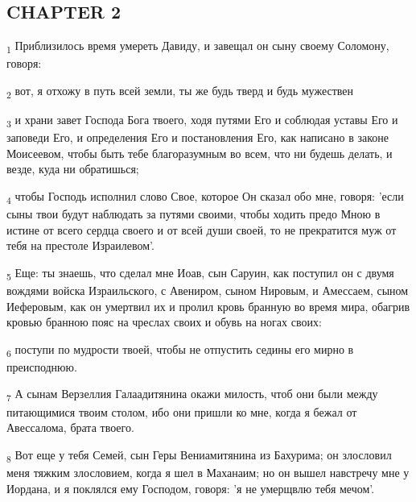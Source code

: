 \subsection{CHAPTER 2}
\begin{tcolorbox}
\textsubscript{1} Приблизилось время умереть Давиду, и завещал он сыну своему Соломону, говоря:
\end{tcolorbox}
\begin{tcolorbox}
\textsubscript{2} вот, я отхожу в путь всей земли, ты же будь тверд и будь мужествен
\end{tcolorbox}
\begin{tcolorbox}
\textsubscript{3} и храни завет Господа Бога твоего, ходя путями Его и соблюдая уставы Его и заповеди Его, и определения Его и постановления Его, как написано в законе Моисеевом, чтобы быть тебе благоразумным во всем, что ни будешь делать, и везде, куда ни обратишься;
\end{tcolorbox}
\begin{tcolorbox}
\textsubscript{4} чтобы Господь исполнил слово Свое, которое Он сказал обо мне, говоря: 'если сыны твои будут наблюдать за путями своими, чтобы ходить предо Мною в истине от всего сердца своего и от всей души своей, то не прекратится муж от тебя на престоле Израилевом'.
\end{tcolorbox}
\begin{tcolorbox}
\textsubscript{5} Еще: ты знаешь, что сделал мне Иоав, сын Саруин, как поступил он с двумя вождями войска Израильского, с Авениром, сыном Нировым, и Амессаем, сыном Иеферовым, как он умертвил их и пролил кровь бранную во время мира, обагрив кровью бранною пояс на чреслах своих и обувь на ногах своих:
\end{tcolorbox}
\begin{tcolorbox}
\textsubscript{6} поступи по мудрости твоей, чтобы не отпустить седины его мирно в преисподнюю.
\end{tcolorbox}
\begin{tcolorbox}
\textsubscript{7} А сынам Верзеллия Галаадитянина окажи милость, чтоб они были между питающимися твоим столом, ибо они пришли ко мне, когда я бежал от Авессалома, брата твоего.
\end{tcolorbox}
\begin{tcolorbox}
\textsubscript{8} Вот еще у тебя Семей, сын Геры Вениамитянина из Бахурима; он злословил меня тяжким злословием, когда я шел в Маханаим; но он вышел навстречу мне у Иордана, и я поклялся ему Господом, говоря: 'я не умерщвлю тебя мечом'.
\end{tcolorbox}

